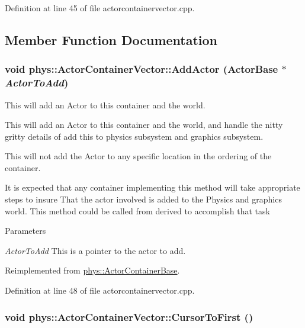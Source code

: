 Definition at line 45 of file actorcontainervector.cpp.



\subsection{Member Function Documentation}
\hypertarget{classphys_1_1ActorContainerVector_a4bc3e38f16caddee021a97739bebaf6e}{
\subsubsection[{AddActor}]{\setlength{\rightskip}{0pt plus 5cm}void phys::ActorContainerVector::AddActor ({\bf ActorBase} $\ast$ {\em ActorToAdd})}}
\label{d3/d64/classphys_1_1ActorContainerVector_a4bc3e38f16caddee021a97739bebaf6e}


This will add an Actor to this container and the world. 

This will add an Actor to this container and the world, and handle the nitty gritty details of add this to physics subsystem and graphics subsystem. \par
\par
 This will not add the Actor to any specific location in the ordering of the container. \par
\par
 It is expected that any container implementing this method will take appropriate steps to insure That the actor involved is added to the Physics and graphics world. This method could be called from derived to accomplish that task 
\begin{DoxyParams}{Parameters}
\item[{\em ActorToAdd}]This is a pointer to the actor to add. \end{DoxyParams}


Reimplemented from \hyperlink{classphys_1_1ActorContainerBase_af32c2adf4c0f928604ce05e20b07ef66}{phys::ActorContainerBase}.



Definition at line 48 of file actorcontainervector.cpp.

\hypertarget{classphys_1_1ActorContainerVector_ad9c2eb2a9405dcf687c86745afc9c031}{
\subsubsection[{CursorToFirst}]{\setlength{\rightskip}{0pt plus 5cm}void phys::ActorContainerVector::CursorToFirst ()}}
\label{d3/d64/classphys_1_1ActorContainerVector_ad9c2eb2a9405dcf687c86745afc9c031}


